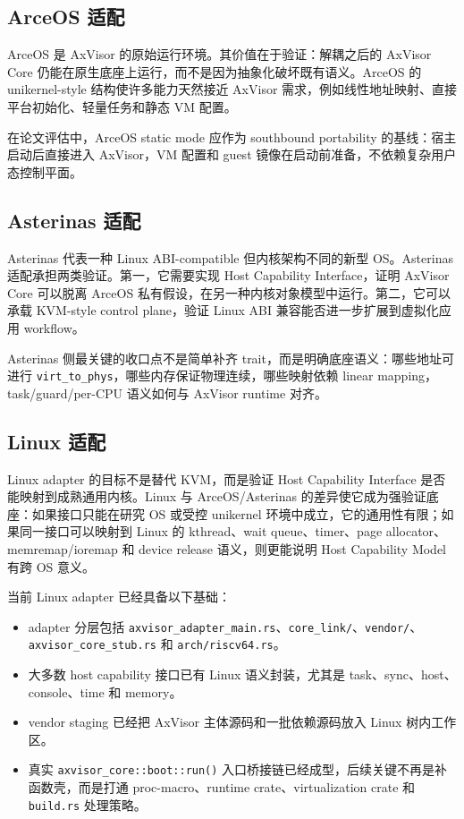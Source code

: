 \documentclass[a4paper,11pt]{article}
\begin{document}
\subsection{ArceOS 适配}

ArceOS 是 AxVisor 的原始运行环境。其价值在于验证：解耦之后的 AxVisor Core 仍能在原生底座上运行，而不是因为抽象化破坏既有语义。ArceOS 的 unikernel-style 结构使许多能力天然接近 AxVisor 需求，例如线性地址映射、直接平台初始化、轻量任务和静态 VM 配置。

在论文评估中，ArceOS static mode 应作为 southbound portability 的基线：宿主启动后直接进入 AxVisor，VM 配置和 guest 镜像在启动前准备，不依赖复杂用户态控制平面。

\subsection{Asterinas 适配}

Asterinas 代表一种 Linux ABI-compatible 但内核架构不同的新型 OS。Asterinas 适配承担两类验证。第一，它需要实现 Host Capability Interface，证明 AxVisor Core 可以脱离 ArceOS 私有假设，在另一种内核对象模型中运行。第二，它可以承载 KVM-style control plane，验证 Linux ABI 兼容能否进一步扩展到虚拟化应用 workflow。

Asterinas 侧最关键的收口点不是简单补齐 trait，而是明确底座语义：哪些地址可进行 \texttt{virt\_to\_phys}，哪些内存保证物理连续，哪些映射依赖 linear mapping，task/guard/per-CPU 语义如何与 AxVisor runtime 对齐。

\subsection{Linux 适配}

Linux adapter 的目标不是替代 KVM，而是验证 Host Capability Interface 是否能映射到成熟通用内核。Linux 与 ArceOS/Asterinas 的差异使它成为强验证底座：如果接口只能在研究 OS 或受控 unikernel 环境中成立，它的通用性有限；如果同一接口可以映射到 Linux 的 kthread、wait queue、timer、page allocator、memremap/ioremap 和 device release 语义，则更能说明 Host Capability Model 有跨 OS 意义。

当前 Linux adapter 已经具备以下基础：

\begin{itemize}
  \item adapter 分层包括 \texttt{axvisor\_adapter\_main.rs}、\texttt{core\_link/}、\texttt{vendor/}、\texttt{axvisor\_core\_stub.rs} 和 \texttt{arch/riscv64.rs}。
  \item 大多数 host capability 接口已有 Linux 语义封装，尤其是 task、sync、host、console、time 和 memory。
  \item vendor staging 已经把 AxVisor 主体源码和一批依赖源码放入 Linux 树内工作区。
  \item 真实 \texttt{axvisor\_core::boot::run()} 入口桥接链已经成型，后续关键不再是补函数壳，而是打通 proc-macro、runtime crate、virtualization crate 和 \texttt{build.rs} 处理策略。
\end{itemize}
\end{document}
